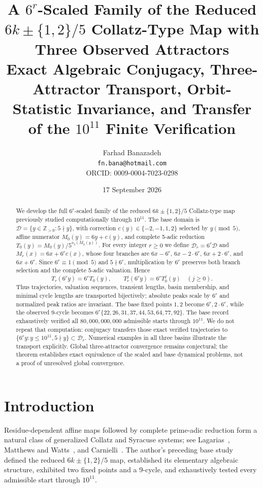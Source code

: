 \documentclass[11pt]{article}
\title{\textbf{\LARGE A $6^r$-Scaled Family of the Reduced $6k\pm\{1,2\}/5$ Collatz-Type Map with Three Observed Attractors}\\[0.55em]
\large Exact Algebraic Conjugacy, Three-Attractor Transport, Orbit-Statistic Invariance, and Transfer of the $10^{11}$ Finite Verification}
\author{Farhad Banazadeh\\\texttt{fn.bana@hotmail.com}\\ORCID: 0009-0004-7023-0298}
\date{17 September 2026}
\begin{document}
\maketitle
\begin{abstract}
We develop the full $6^r$-scaled family of the reduced $6k\pm\{1,2\}/5$ Collatz-type map previously studied computationally through $10^{11}$. The base domain is $\mathcal D=\{y\in\mathbb Z_{>0}:5\nmid y\}$, with correction $c(y)\in\{-2,-1,1,2\}$ selected by $y\pmod5$, affine numerator $M_0(y)=6y+c(y)$, and complete 5-adic reduction $T_0(y)=M_0(y)/5^{\nu_5(M_0(y))}$. For every integer $r\ge0$ we define $\mathcal D_r=6^r\mathcal D$ and $M_r(x)=6x+6^r c(x)$, whose four branches are $6x-6^r$, $6x-2\cdot6^r$, $6x+2\cdot6^r$, and $6x+6^r$. Since $6^r\equiv1\pmod5$ and $5\nmid6^r$, multiplication by $6^r$ preserves both branch selection and the complete 5-adic valuation. Hence
\[
T_r(6^r y)=6^rT_0(y),\qquad T_r^j(6^r y)=6^rT_0^j(y)\quad(j\ge0).
\]
Thus trajectories, valuation sequences, transient lengths, basin membership, and minimal cycle lengths are transported bijectively; absolute peaks scale by $6^r$ and normalized peak ratios are invariant. The base fixed points $1,2$ become $6^r,2\cdot6^r$, while the observed 9-cycle becomes $6^r\{22,26,31,37,44,53,64,77,92\}$. The base record exhaustively verified all $80{,}000{,}000{,}000$ admissible starts through $10^{11}$. We do not repeat that computation: conjugacy transfers those exact verified trajectories to $\{6^r y:y\le10^{11},5\nmid y\}\subset\mathcal D_r$. Numerical examples in all three basins illustrate the transport explicitly. Global three-attractor convergence remains conjectural; the theorem establishes exact equivalence of the scaled and base dynamical problems, not a proof of unresolved global convergence.
\end{abstract}

\section{Introduction}
Residue-dependent affine maps followed by complete prime-adic reduction form a natural class of generalized Collatz and Syracuse systems; see Lagarias~\cite{Lagarias1985}, Matthews and Watts~\cite{MatthewsWatts1985}, and Carnielli~\cite{Carnielli2015}. The author's preceding base study~\cite{BanazadehBase2026} defined the reduced $6k\pm\{1,2\}/5$ map, established its elementary algebraic structure, exhibited two fixed points and a 9-cycle, and exhaustively tested every admissible start through $10^{11}$.
\end{document}
